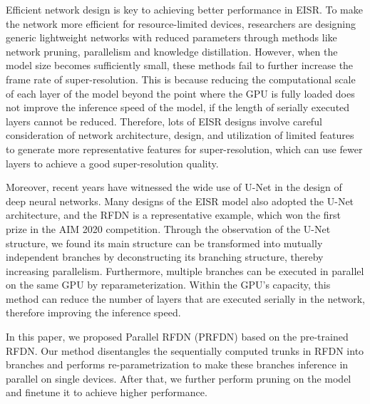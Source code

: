 \documentclass[10pt,twocolumn,letterpaper]{article}
\begin{document}
Efficient network design is key to achieving better performance in EISR.
To make the network more efficient for resource-limited devices, researchers are designing generic lightweight networks with reduced parameters through methods like network pruning\cite{liuSplitSREndtoEndApproach2021,leeMobiSREfficientOnDevice2019,fang2023depgraph}, parallelism\cite{sandlerMobileNetV2InvertedResiduals2019,howardMobileNetsEfficientConvolutional2017,liuSplitSREndtoEndApproach2021,kongClassSRGeneralFramework2021} and knowledge distillation\cite{liu2020residual,khaniRealTimeVideoInference2021,taoCompressionGenerativePretrained2022,zhangDataFreeKnowledgeDistillation2021}.
However, when the model size becomes sufficiently small, these methods fail to further increase the frame rate of super-resolution. This is because reducing the computational scale of each layer of the model beyond the point where the GPU is fully loaded does not improve the inference speed of the model, if the length of serially executed layers cannot be reduced.
Therefore, lots of EISR designs\cite{liNTIRE2022Challenge2022,duFastMemoryEfficientNetwork2022,mehtaEVRNetEfficientVideo2021} involve careful consideration of network architecture, design, and utilization of limited features to generate more representative features for super-resolution, which can use fewer layers to achieve a good super-resolution quality.

Moreover, recent years have witnessed the wide use of U-Net\cite{ronnebergerUNetConvolutionalNetworks2015} in the design of deep neural networks. 
Many designs of the EISR model also adopted the U-Net architecture, and the RFDN\cite{liu2020residual} is a representative example, which won the first prize in the AIM 2020 competition. 
Through the observation of the U-Net structure, we found its main structure can be transformed into mutually independent branches by deconstructing its branching structure, thereby increasing parallelism. 
Furthermore, multiple branches can be executed in parallel on the same GPU by reparameterization. 
Within the GPU's capacity, this method can reduce the number of layers that are executed serially in the network, therefore improving the inference speed.

In this paper, we proposed Parallel RFDN (PRFDN) based on the pre-trained RFDN. Our method disentangles the sequentially computed trunks in RFDN into branches and performs re-parametrization to make these branches inference in parallel on single devices. After that, we further perform pruning on the model and finetune it to achieve higher performance.
\end{document}
